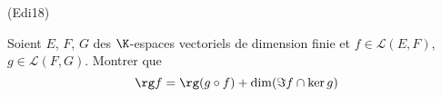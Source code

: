 \begin{tiny}(Edi18)\end{tiny} Soient $E$, $F$, $G$ des $\K$-espaces vectoriels de dimension finie et $f\in \mathcal L(E,F)$, $g\in \mathcal L(F,G)$. Montrer que
\begin{displaymath}
 \rg f = \rg(g\circ f)+\dim(\Im f \cap \ker g)
\end{displaymath}
